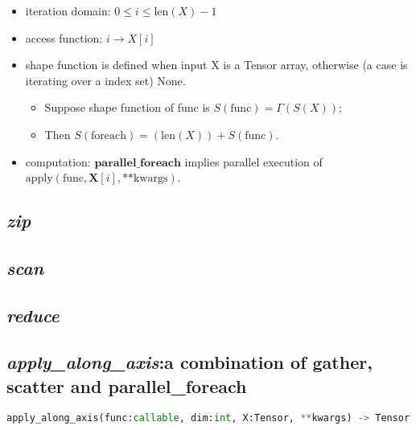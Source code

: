 \begin{itemize}
  \item iteration domain: $0 \le i \le \text{len}(X) - 1$
  \item access function: $i \rightarrow X[i]$
  \item shape function is defined when input X is a Tensor array, otherwise (a case is iterating over a index set) None.
 \begin{itemize}
   \item Suppose shape function of func is $S(\text{func}) = \Gamma(S(X))$;
   \item Then $S(\text{foreach}) = (\text{len}(X)) + S(\text{func})$.
 \end{itemize}
 \item computation: $\textbf{parallel\_foreach}$ implies parallel execution of $\text{apply}(\text{func}, \textbf{X}[i], \text{**kwargs})$.
\end{itemize}

\subsection{\textbf{\textit{zip}}}

\subsection{\textbf{\textit{scan}}}

\subsection{\textbf{\textit{reduce}}}

\subsection{\textbf{\textit{apply\_along\_axis}}:a combination of gather, scatter and parallel\_foreach}

\begin{lstlisting}[language=Python]
apply_along_axis(func:callable, dim:int, X:Tensor, **kwargs) -> Tensor
\end{lstlisting}

